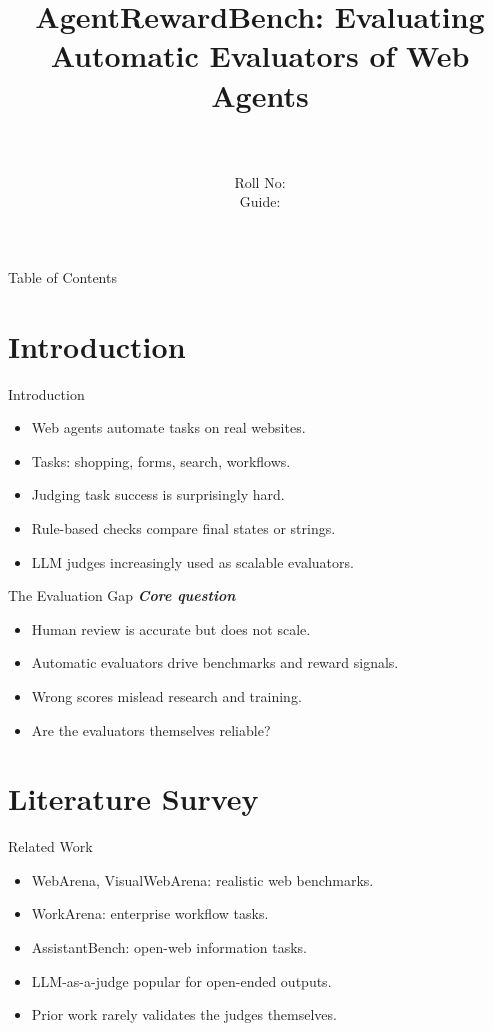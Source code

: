 \documentclass{beamer}
\title[\seminarShortTitle]{AgentRewardBench: Evaluating Automatic Evaluators of Web Agents}
\author[\seminarName\ (\seminarShortCollege)]{\seminarName \\ \seminarRoll \\ Roll No: \seminarClassRoll \\ Guide: \seminarGuide}
\institute[\seminarShortCollege]{\seminarDept \\ \seminarCollege}
\date{\seminarDate}
\begin{document}
\begin{frame}\titlepage\end{frame}
\begin{frame}{Table of Contents}\tableofcontents\end{frame}
\section{Introduction}
\begin{frame}{Introduction}
\begin{itemize}
\item Web agents automate tasks on real websites.
\item Tasks: shopping, forms, search, workflows.
\item Judging task success is surprisingly hard.
\item Rule-based checks compare final states or strings.
\item LLM judges increasingly used as scalable evaluators.
\end{itemize}
\end{frame}

\begin{frame}{The Evaluation Gap}
\textbf{\textit{Core question}}
\begin{itemize}
\item Human review is accurate but does not scale.
\item Automatic evaluators drive benchmarks and reward signals.
\item Wrong scores mislead research and training.
\item Are the evaluators themselves reliable?
\end{itemize}
\end{frame}

\section{Literature Survey}
\begin{frame}{Related Work}
\begin{itemize}
\item WebArena, VisualWebArena: realistic web benchmarks.
\item WorkArena: enterprise workflow tasks.
\item AssistantBench: open-web information tasks.
\item LLM-as-a-judge popular for open-ended outputs.
\item Prior work rarely validates the judges themselves.
\end{itemize}
\end{frame}
\end{document}
